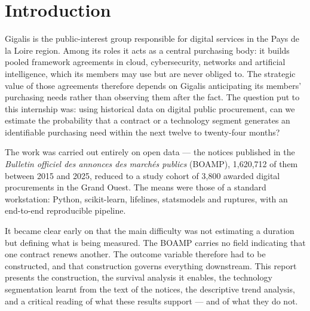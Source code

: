 \section{Introduction}

Gigalis is the public-interest group responsible for digital services in the Pays de la Loire region. Among its roles it acts as a central purchasing body: it builds pooled framework agreements in cloud, cybersecurity, networks and artificial intelligence, which its members may use but are never obliged to. The strategic value of those agreements therefore depends on Gigalis anticipating its members' purchasing needs rather than observing them after the fact. The question put to this internship was: using historical data on digital public procurement, can we estimate the probability that a contract or a technology segment generates an identifiable purchasing need within the next twelve to twenty-four months?

The work was carried out entirely on open data --- the notices published in the \emph{Bulletin officiel des annonces des marchés publics} (BOAMP), 1,620,712 of them between 2015 and 2025, reduced to a study cohort of 3,800 awarded digital procurements in the Grand Ouest. The means were those of a standard workstation: Python, scikit-learn, lifelines, statsmodels and ruptures, with an end-to-end reproducible pipeline.

It became clear early on that the main difficulty was not estimating a duration but defining what is being measured. The BOAMP carries no field indicating that one contract renews another. The outcome variable therefore had to be constructed, and that construction governs everything downstream. This report presents the construction, the survival analysis it enables, the technology segmentation learnt from the text of the notices, the descriptive trend analysis, and a critical reading of what these results support --- and of what they do not.
